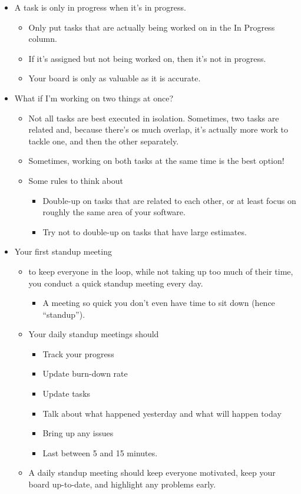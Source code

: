 \documentclass[letterpaper]{article}
\begin{document}
\begin{itemize}
    \item A task is only in progress when it's in progress.
    \begin{itemize}
        \item Only put tasks that are actually being worked on in the In Progress column. 
        \item If it's assigned but not being worked on, then it's not in progress.
        \item Your board is only as valuable as it is accurate. 
    \end{itemize}

    \item What if I'm working on two things at once? 
    \begin{itemize}
        \item Not all tasks are best executed in isolation. Sometimes, two tasks are related and, because there's os much overlap, it's actually more work to tackle one, and then the other separately. 
        \item Sometimes, working on both tasks at the same time is the best option! 
        \item Some rules to think about 
        \begin{itemize}
            \item Double-up on tasks that are related to each other, or at least focus on roughly the same area of your software. 
            \item Try not to double-up on tasks that have large estimates. 
        \end{itemize}
    \end{itemize}

    \item Your first standup meeting 
    \begin{itemize}
        \item to keep everyone in the loop, while not taking up too much of their time, you conduct a quick standup meeting every day. 
        \begin{itemize}
            \item A meeting so quick you don't even have time to sit down (hence ``standup'').
        \end{itemize}

        \item Your daily standup meetings should 
        \begin{itemize}
            \item Track your progress 
            \item Update burn-down rate 
            \item Update tasks 
            \item Talk about what happened yesterday and what will happen today 
            \item Bring up any issues 
            \item Last between 5 and 15 minutes. 
        \end{itemize}
        \item A daily standup meeting should keep everyone motivated, keep your board up-to-date, and highlight any problems early. 
    \end{itemize}


\end{itemize}
\end{document}
